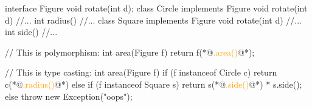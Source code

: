 \documentclass{article}
\begin{document}

\begin{lnSnippet}
interface Figure
  void rotate(int d);
class Circle implements Figure
  void rotate(int d) //...
  int radius() //...
class Square implements Figure
  void rotate(int d) //...
  int side() //...
\end{lnSnippet}
\begin{lnSnippet}
// This is polymorphism:
int area(Figure f)
  return f(*@\textcolor{orange}{.area()}@*);

// This is type casting:
int area(Figure f)
  if (f instanceof Circle c) {
    return c(*@\textcolor{orange}{.radius()}@*)
  } else if (f instanceof Square s) {
    return s(*@\textcolor{orange}{.side()}@*) * s.side();
  } else {
    throw new Exception("oops");
  }
\end{lnSnippet}
\end{document}
